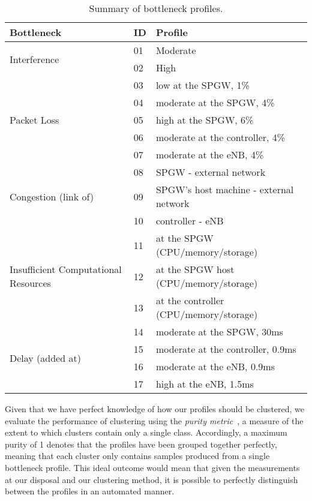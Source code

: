 \documentclass[journal,comsoc]{IEEEtran}
\begin{document}
% 
\begin{table}
\small
\begin{tabular}{ | m{1.8cm} | m{0.3cm} | m{5.5cm} | } 
\hline
\textbf{Bottleneck} & \textbf{ID} & \textbf{Profile} \\
\hline
\multirow{2}{1.8cm}{Interference} 
& 01 & Moderate \\ \cline{2-3}
& 02 & High \\ \hline
\multirow{5}{1.8cm}{Packet Loss} 
& 03 & low at the SPGW, 1\%\\ \cline{2-3}
& 04 & moderate at the SPGW, 4\%\\ \cline{2-3}
& 05 & high at the SPGW, 6\%\\ \cline{2-3}
& 06 & moderate at the controller, 4\%\\ \cline{2-3}
& 07 & moderate at the eNB, 4\%\\ \hline
\multirow{3}{1.8cm}{Congestion \newline (link of)} 
& 08 & SPGW - external network \\ \cline{2-3}
& 09 & SPGW's host machine - external network \\ \cline{2-3}
& 10 & controller - eNB \\ \hline
\multirow{3}{1.8cm}{Insufficient \newline Computational \newline Resources} 
& 11 & at the SPGW (CPU/memory/storage) \\ \cline{2-3}
& 12 & at the SPGW host (CPU/memory/storage) \\ \cline{2-3}
& 13 & at the controller (CPU/memory/storage) \\ \hline
\multirow{4}{1.8cm}{Delay \newline (added at)} 
& 14 & moderate at the SPGW, 30ms \\ \cline{2-3}
& 15 & moderate at the controller, 0.9ms \\ \cline{2-3}
& 16 & moderate at the eNB, 0.9ms \\ \cline{2-3}
& 17 & high at the eNB, 1.5ms \\ \hline
\end{tabular}
\vspace{1mm}
\caption{Summary of bottleneck profiles.}
\vspace{-8mm}
\label{table:2}
\end{table}

% 
Given that we have perfect knowledge of how our profiles should be clustered, we evaluate the performance of clustering using the {\em purity metric}~\cite{schutze2008introduction}, a measure of the extent to which clusters contain only a single class.
Accordingly, a maximum purity of 1 denotes that the profiles have been grouped together perfectly, meaning that each cluster only contains samples produced from a single bottleneck profile.
This ideal outcome would mean that given the measurements at our disposal and our clustering method, it is possible to perfectly distinguish between the profiles in an automated manner.
\end{document}
